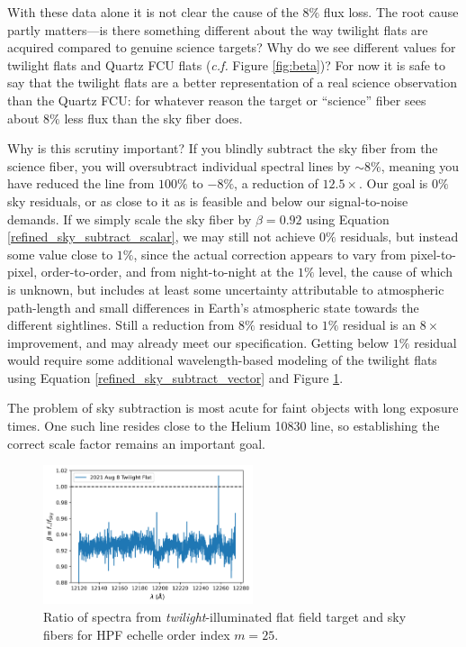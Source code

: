 \documentclass[modern]{aastex631}
\begin{document}
With these data alone it is not clear the cause of the $8\%$ flux loss.  The root cause partly matters---is there something different about the way twilight flats are acquired compared to genuine science targets?  Why do we see different values for twilight flats and Quartz FCU flats (\emph{c.f.} Figure \ref{fig:beta})?  For now it is safe to say that the twilight flats are a better representation of a real science observation than the Quartz FCU: for whatever reason the target or ``science'' fiber sees about $8\%$ less flux than the sky fiber does.

Why is this scrutiny important?  If you blindly subtract the sky fiber from the science fiber, you will oversubtract individual spectral lines by $\sim8\%$, meaning you have reduced the line from $100\%$ to $-8\%$, a reduction of $12.5\times$.  Our goal is $0\%$ sky residuals, or as close to it as is feasible and below our signal-to-noise demands.  If we simply scale the sky fiber by $\beta=0.92$ using Equation \ref{refined_sky_subtract_scalar}, we may still not achieve $0\%$ residuals, but instead some value close to $1\%$, since the actual correction appears to vary from pixel-to-pixel, order-to-order, and from night-to-night at the $1\%$ level, the cause of which is unknown, but includes at least some uncertainty attributable to atmospheric path-length and small differences in Earth's atmospheric state towards the different sightlines.  Still a reduction from $8\%$ residual to $1\%$ residual is an $8\times$ improvement, and may already meet our specification.  Getting below $1\%$ residual would require some additional wavelength-based modeling of the twilight flats using Equation \ref{refined_sky_subtract_vector} and Figure \ref{fig:beta_twilight}.

The problem of sky subtraction is most acute for faint objects with long exposure times.  One such line resides close to the Helium 10830 line, so establishing the correct scale factor remains an important goal.

\begin{figure}[ht]
  \centering
  \includegraphics[width=0.55\textwidth]{figures/HPF_twilight_2021Aug8.png}
\caption{Ratio of spectra from \emph{twilight}-illuminated flat field target and sky fibers for HPF echelle order index $m=25$.  }
\label{fig:beta_twilight}
\end{figure}
\end{document}
